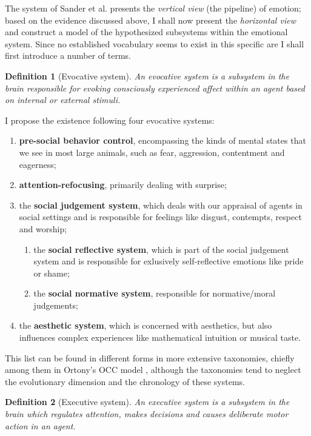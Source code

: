 \documentclass[]{scrartcl}
\theoremstyle{break}
\newtheorem{definition}{Definition}
\begin{document}
The system of Sander et al. presents the {\em vertical view} (the pipeline) of emotion; based on the evidence discussed above, I shall now present the {\em horizontal view} and construct a model of the hypothesized subsystems within the emotional system. Since no established vocabulary seems to exist in this specific are I shall first introduce a number of terms.

\begin{definition}[Evocative system]
An evocative system is a subsystem in the brain responsible for evoking consciously experienced affect within an agent based on internal or external stimuli.
\end{definition} 

I propose the existence following four evocative systems:

\begin{enumerate}
	\item \textbf{pre-social behavior control}, encompassing the kinds of mental states that we see in most large animals, such as fear, aggression, contentment and eagerness;
	\item \textbf{attention-refocusing}, primarily dealing with surprise;
	\item the \textbf{social judgement system}, which deals with our appraisal of agents in social settings and is responsible for feelings like disgust, contempts, respect and worship;
		\begin{enumerate}
				\item the \textbf{social reflective system}, which is part of the social judgement system and is responsible for exlusively self-reflective emotions like pride or shame;
				\item the \textbf{social normative system}, responsible for normative/moral judgements;
		\end{enumerate}
	\item the \textbf{aesthetic system}, which is concerned with aesthetics, but also influences complex experiences like mathematical intuition or musical taste.
\end{enumerate}

This list can be found in different forms in more extensive taxonomies, chiefly among them in Ortony's OCC model \cite{ortony1988}, although the taxonomies tend to neglect the evolutionary dimension and the chronology of these systems.

\begin{definition}[Executive system]
An executive system is a subsystem in the brain which regulates attention, makes decisions and causes deliberate motor action in an agent.
\end{definition}
\end{document}
